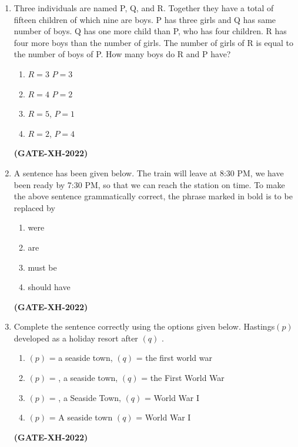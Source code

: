 \documentclass[journal]{IEEEtran}
\begin{document}
\begin{enumerate}
\item Three individuals are named P, Q, and R. Together they have a total of fifteen children of which nine are boys. P has three girls and Q has same number of boys. Q has one more child than P, who has four children. R has four more boys than the number of girls. The number of girls of R is equal to the number of boys of P. How many boys do R and P have?
\begin{multicols}{4}
\begin{enumerate}
\item $R=3$ $P=3$
\item $R=4$ $P=2$
\item $R=5$, $P=1$
\item $R=2$, $P=4$
\end{enumerate}
\end{multicols}
\hfill\textbf{(GATE-XH-2022)}

\item A sentence has been given below. The train will leave at 8:30 PM, we have been ready by 7:30 PM, so that we can reach the station on time. To make the above sentence grammatically correct, the phrase marked in bold is to be replaced by
\begin{enumerate}
\item were
\item are
\item must be
\item should have
\end{enumerate}
\hfill\textbf{(GATE-XH-2022)}

\item Complete the sentence correctly using the options given below. Hastings\underline{\hspace{1cm}}$(p)$\underline{\hspace{1cm}} developed as a holiday resort after \underline{\hspace{1cm}}$(q)$\underline{\hspace{1cm}} .
\begin{enumerate}
\item $(p)$ = a seaside town, $(q)$ = the first world war
\item $(p)$ = , a seaside town, $(q)$ = the First World War
\item $(p)$ = , a Seaside Town, $(q)$ = World War I
\item $(p)$ = A seaside town $(q)$ = World War I
\end{enumerate}
\hfill\textbf{(GATE-XH-2022)}


\end{enumerate}
\end{document}

